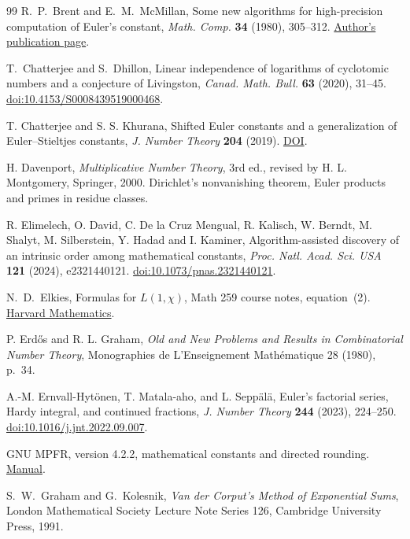 \documentclass[11pt,a4paper,oneside,openany]{report}
\theoremstyle{remark}\newtheorem{remark}[theorem]{Remark}
\numberwithin{equation}{section}
\begin{document}
\begin{thebibliography}{99}
 R.~P.~Brent and E.~M.~McMillan, Some new algorithms for high-precision computation of Euler's constant, \emph{Math. Comp.} \textbf{34} (1980), 305--312. \href{https://maths-people.anu.edu.au/~brent/pub/pub049.html}{Author's publication page}.

 T.~Chatterjee and S.~Dhillon, Linear independence of logarithms of cyclotomic numbers and a conjecture of Livingston, \emph{Canad. Math. Bull.} \textbf{63} (2020), 31--45. \href{https://doi.org/10.4153/S0008439519000468}{doi:10.4153/S0008439519000468}.

 T. Chatterjee and S. S. Khurana, Shifted Euler constants and a generalization of Euler--Stieltjes constants, \emph{J. Number Theory} \textbf{204} (2019). \href{https://doi.org/10.1016/j.jnt.2019.04.001}{DOI}.

 H. Davenport, \emph{Multiplicative Number Theory}, 3rd ed., revised by H. L. Montgomery, Springer, 2000. Dirichlet's nonvanishing theorem, Euler products and primes in residue classes.

 R. Elimelech, O. David, C. De la Cruz Mengual, R. Kalisch, W. Berndt, M. Shalyt, M. Silberstein, Y. Hadad and I. Kaminer, Algorithm-assisted discovery of an intrinsic order among mathematical constants, \emph{Proc. Natl. Acad. Sci. USA} \textbf{121} (2024), e2321440121. \href{https://doi.org/10.1073/pnas.2321440121}{doi:10.1073/pnas.2321440121}.

 N.~D.~Elkies, Formulas for $L(1,\chi)$, Math 259 course notes, equation~(2). \href{https://people.math.harvard.edu/~elkies/M259.06/l1x.pdf}{Harvard Mathematics}.

 P. Erd\H{o}s and R. L. Graham, \emph{Old and New Problems and Results in Combinatorial Number Theory}, Monographies de L'Enseignement Math\'ematique 28 (1980), p.~34.

 A.-M. Ernvall-Hyt\"onen, T. Matala-aho, and L. Sepp\"al\"a, Euler's factorial series, Hardy integral, and continued fractions, \emph{J. Number Theory} \textbf{244} (2023), 224--250. \href{https://doi.org/10.1016/j.jnt.2022.09.007}{doi:10.1016/j.jnt.2022.09.007}.

 GNU MPFR, version 4.2.2, mathematical constants and directed rounding. \href{https://www.mpfr.org/mpfr-4.2.2/mpfr.html}{Manual}.

 S.~W.~Graham and G.~Kolesnik, \emph{Van der Corput's Method of Exponential Sums}, London Mathematical Society Lecture Note Series 126, Cambridge University Press, 1991.


\end{thebibliography}
\end{document}
